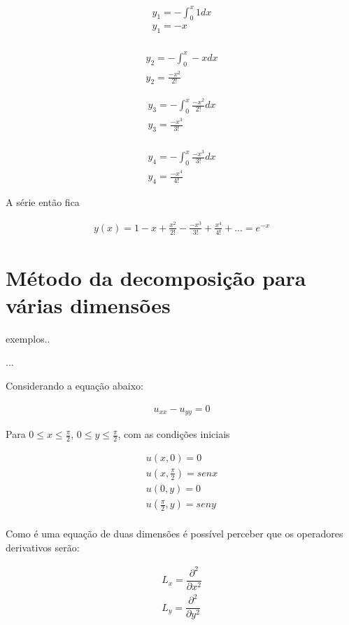 \begin{gather*}
y_{1} = -\int_0^x 1dx\\
y_{1} = -x\\
\end{gather*}

\begin{gather*}
y_{2} = -\int_0^x -xdx\\
y_{2} = \frac{-x^2}{2!}
\end{gather*}

\begin{gather*}
y_{3} = -\int_0^x \frac{-x^2}{2!}dx\\
y_{3} = \frac{-x^3}{3!}\\
\end{gather*}

\begin{gather*}
y_{4} = -\int_0^x \frac{-x^3}{3!}dx\\
y_{4} = \frac{-x^4}{4!}
\end{gather*}

A série então fica

\begin{gather*}
y(x) = 1 - x + \frac{x^2}{2!} - \frac{-x^3}{3!} + \frac{x^4}{4!} +... = e^{-x}
\end{gather*}

\section{Método da decomposição para várias dimensões}
exemplos..

...

Considerando a equação abaixo:

\begin{gather*}
 u_{xx} - u_{yy} = 0
\end{gather*}

Para $0\leq x \leq \frac{\pi}{2}$, $0\leq y \leq \frac{\pi}{2}$, com as condições iniciais 

\begin{gather*}
u(x,0) = 0\\
u\left(x,\frac{\pi}{2}\right) = senx\\
u(0,y) = 0\\
u\left(\frac{\pi}{2},y\right) = seny\\
\end{gather*}

Como é uma equação de duas dimensões é possível perceber que os operadores derivativos serão: 

\begin{gather*}
L_{x} =\dfrac{\partial ^2}{\partial x^2}\\
L_{y} = \dfrac{\partial ^2}{\partial y^2}       
\end{gather*}

